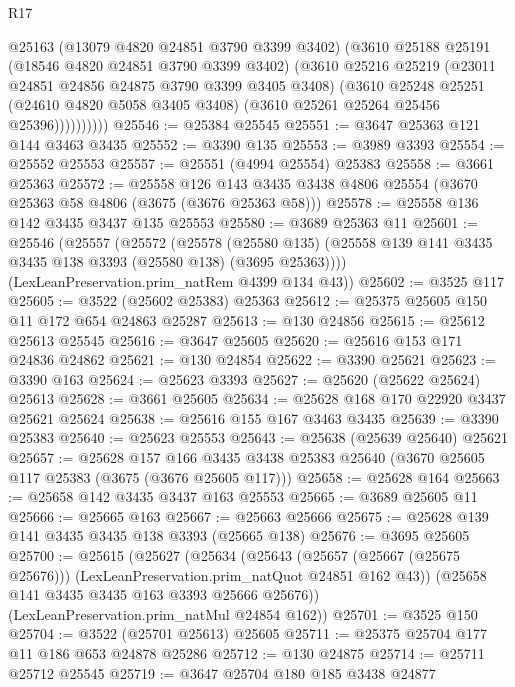 \begin{lexlean}{R17}
\begin{coremodule}
                @25163
                (@13079 @4820 @24851 @3790 @3399 @3402)
                (@3610
                  @25188
                  @25191
                  (@18546 @4820 @24851 @3790 @3399 @3402)
                  (@3610
                    @25216
                    @25219
                    (@23011 @24851 @24856 @24875 @3790 @3399 @3405 @3408)
                    (@3610
                      @25248
                      @25251
                      (@24610 @4820 @5058 @3405 @3408)
                      (@3610 @25261 @25264 @25456 @25396))))))))))
@25546 := @25384 @25545
@25551 := @3647 @25363 @121 @144 @3463 @3435
@25552 := @3390 @135
@25553 := @3989 @3393
@25554 := @25552 @25553
@25557 := @25551 (@4994 @25554) @25383
@25558 := @3661 @25363
@25572 := @25558
    @126
    @143
    @3435
    @3438
    @4806
    @25554
    (@3670 @25363 @58 @4806 (@3675 (@3676 @25363 @58)))
@25578 := @25558 @136 @142 @3435 @3437 @135 @25553
@25580 := @3689 @25363 @11
@25601 := @25546
    (@25557
      (@25572
        (@25578
          (@25580 @135)
          (@25558 @139 @141 @3435 @3435 @138 @3393 (@25580 @138) (@3695 @25363))))
      (LexLeanPreservation.prim_natRem @4399 @134 @43))
@25602 := @3525 @117
@25605 := @3522 (@25602 @25383) @25363
@25612 := @25375 @25605 @150 @11 @172 @654 @24863 @25287
@25613 := @130 @24856
@25615 := @25612 @25613 @25545
@25616 := @3647 @25605
@25620 := @25616 @153 @171 @24836 @24862
@25621 := @130 @24854
@25622 := @3390 @25621
@25623 := @3390 @163
@25624 := @25623 @3393
@25627 := @25620 (@25622 @25624) @25613
@25628 := @3661 @25605
@25634 := @25628 @168 @170 @22920 @3437 @25621 @25624
@25638 := @25616 @155 @167 @3463 @3435
@25639 := @3390 @25383
@25640 := @25623 @25553
@25643 := @25638 (@25639 @25640) @25621
@25657 := @25628
    @157
    @166
    @3435
    @3438
    @25383
    @25640
    (@3670 @25605 @117 @25383 (@3675 (@3676 @25605 @117)))
@25658 := @25628 @164
@25663 := @25658 @142 @3435 @3437 @163 @25553
@25665 := @3689 @25605 @11
@25666 := @25665 @163
@25667 := @25663 @25666
@25675 := @25628 @139 @141 @3435 @3435 @138 @3393 (@25665 @138)
@25676 := @3695 @25605
@25700 := @25615
    (@25627
      (@25634
        (@25643
          (@25657 (@25667 (@25675 @25676)))
          (LexLeanPreservation.prim_natQuot @24851 @162 @43))
        (@25658 @141 @3435 @3435 @163 @3393 @25666 @25676))
      (LexLeanPreservation.prim_natMul @24854 @162))
@25701 := @3525 @150
@25704 := @3522 (@25701 @25613) @25605
@25711 := @25375 @25704 @177 @11 @186 @653 @24878 @25286
@25712 := @130 @24875
@25714 := @25711 @25712 @25545
@25719 := @3647 @25704 @180 @185 @3438 @24877

\end{coremodule}
\end{lexlean}
